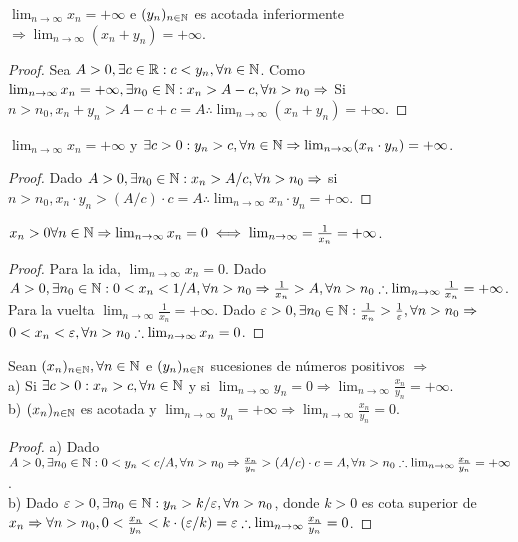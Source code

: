 \begin{prop}
  $\lim_{n \to \infty} x_n = + \infty$ e $(y_n)_{n \in \mathbb{N}}$ es acotada inferiormente $\Rightarrow \lim_{n \to \infty} (x_n + y_n) = +\infty$.
  \begin{proof}
    Sea $A > 0, \exists c \in \mathbb{R} : c < y_n, \forall n \in \mathbb{N}$.
    Como $\lim_{n \to \infty} x_n = + \infty, \exists n_0 \in \mathbb{N} : x_n > A - c, \forall n > n_0 \Rightarrow$
    Si $n > n_0, x_n + y_n > A - c + c = A \therefore \lim_{n \to \infty} (x_n + y_n) = +\infty$.
  \end{proof}
\end{prop}

\begin{prop}
  $\lim_{n \to \infty} x_n = +\infty$ y $\exists c > 0 : y_n > c, \forall n \in \mathbb{N} \Rightarrow \lim_{n \to \infty} (x_n \cdot y_n) = + \infty$.
  \begin{proof}
    Dado $A > 0, \exists n_0 \in \mathbb{N} : x_n > A/c, \forall n > n_0 \Rightarrow$ si $n > n_0, x_n \cdot y_n > (A/c) \cdot c = A \therefore \lim_{n \to \infty} x_n \cdot y_n = + \infty$.
  \end{proof}
\end{prop}


\begin{prop}
  $x_n > 0 \forall n \in \mathbb{N} \Rightarrow \lim_{n \to \infty} x_n = 0 \iff \lim_{n \to \infty} = \frac{1}{x_n} = +\infty$.
  \begin{proof}
    Para la ida, $\lim_{n \to \infty} x_n = 0$. Dado $A > 0, \exists n_0 \in \mathbb{N} : 0 < x_n < 1/A, \forall n > n_0 \Rightarrow \frac{1}{x_n} > A, \forall n > n_0 \therefore \lim_{n \to \infty} \frac{1}{x_n} = +\infty$. \\
    Para la vuelta $\lim_{n \to \infty} \frac{1}{x_n} = +\infty$. Dado $\varepsilon > 0, \exists n_0 \in \mathbb{N} : \frac{1}{x_n} > \frac{1}{\varepsilon}, \forall n > n_0 \Rightarrow$ \\
    $0 < x_n < \varepsilon, \forall n > n_0 \therefore \lim_{n \to \infty} x_n = 0$.
  \end{proof}
\end{prop}

\begin{prop}
  Sean $(x_n)_{n \in \mathbb{N}}, \forall n \in \mathbb{N}$ e $(y_n)_{n \in \mathbb{N}}$ sucesiones de números positivos $\Rightarrow$ \\
  a) Si $\exists c > 0 : x_n > c, \forall n \in \mathbb{N}$ y si $\lim_{n \to \infty} y_n = 0 \Rightarrow \lim_{n \to \infty} \frac{x_n}{y_n} = +\infty$. \\
  b) $(x_n)_{n \in \mathbb{N}}$ es acotada y $\lim_{n \to \infty} y_n = +\infty \Rightarrow \lim_{n \to \infty} \frac{x_n}{y_n} = 0$.
  \begin{proof}
    a) Dado $A > 0, \exists n_0 \in \mathbb{N} : 0 < y_n < c/A, \forall n > n_0 \Rightarrow \frac{x_n}{y_n} > (A/c) \cdot c = A, \forall n > n_0 \therefore \lim_{n \to \infty} \frac{x_n}{y_n} = + \infty$. \\
    b) Dado $\varepsilon > 0, \exists n_0 \in \mathbb{N} : y_n > k/\varepsilon, \forall n > n_0$, donde $k > 0$ es cota superior de $x_n \Rightarrow \forall n > n_0, 0 < \frac{x_n}{y_n} < k \cdot (\varepsilon/k) = \varepsilon \therefore \lim_{n \to \infty} \frac{x_n}{y_n} = 0$.
  \end{proof}
\end{prop}

